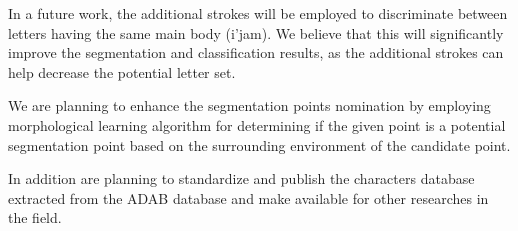 In a future work, the additional strokes will be employed to discriminate between letters having the same main body (i'jam).
We believe that this will significantly improve the segmentation and classification results, as the additional strokes can help decrease the potential letter set.

We are planning to enhance the segmentation points nomination by employing morphological learning algorithm for determining if the given point is a potential segmentation point based on the surrounding environment of the candidate point. 

In addition are planning to standardize and publish the characters database extracted from the ADAB database and make available for other researches in the field.

%